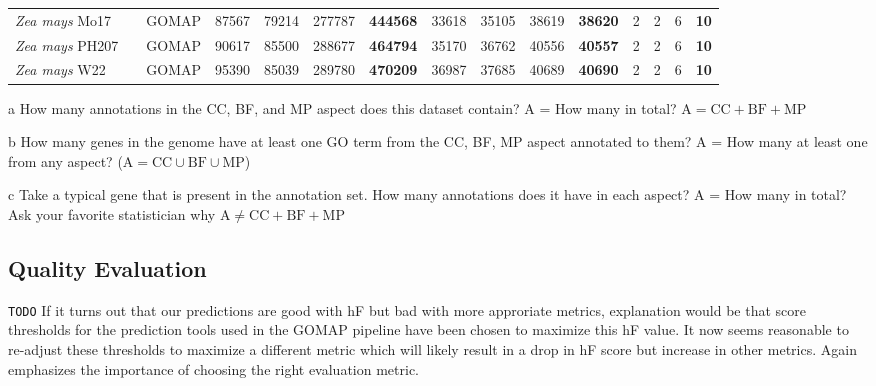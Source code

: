 \documentclass[utf8]{frontiersSCNS}
\begin{document}
\begin{table}[t]
{\begin{threeparttable}
\begin{tabular}{lrlrrr>{\bfseries}r|rrr>{\bfseries}r|rrr>{\bfseries}r}
\textit{Zea mays} Mo17 &  & GOMAP & 87567 & 79214 & 277787 & 444568 & 33618 & 35105 & 38619 & 38620 & 2 & 2 & 6 & 10\\

\rowcolor{gray!6}  \textit{Zea mays} PH207 &  & GOMAP & 90617 & 85500 & 288677 & 464794 & 35170 & 36762 & 40556 & 40557 & 2 & 2 & 6 & 10\\

\textit{Zea mays} W22 & \multirow{-24}{*}{\raggedleft\arraybackslash 100} & GOMAP & 95390 & 85039 & 289780 & 470209 & 36987 & 37685 & 40689 & 40690 & 2 & 2 & 6 & 10\\
\bottomrule
\end{tabular}
\begin{tablenotes}
\item[a] How many annotations in the CC, BF, and MP aspect does this dataset contain? A = How many in total? $\textrm{A} = \textrm{CC} + \textrm{BF} + \textrm{MP}$
\item[b] How many genes in the genome have at least one GO term from the CC, BF, MP aspect annotated to them? A = How many at least one from any aspect? ($\textrm{A} = \textrm{CC} \cup \textrm{BF} \cup \textrm{MP}$)
\item[c] Take a typical gene that is present in the annotation set. How many annotations does it have in each aspect? A = How many in total? Ask your favorite statistician why $\textrm{A} \neq \textrm{CC} + \textrm{BF} +\textrm{MP}$
\end{tablenotes}
\end{threeparttable}}
\end{table}

\hypertarget{quality-evaluation}{%
\subsection{Quality Evaluation}\label{quality-evaluation}}

\texttt{TODO} If it turns out that our predictions are good with hF but bad with more approriate metrics, explanation would be that score thresholds for the prediction tools used in the GOMAP pipeline have been chosen to maximize this hF value. It now seems reasonable to re-adjust these thresholds to maximize a different metric which will likely result in a drop in hF score but increase in other metrics. Again emphasizes the importance of choosing the right evaluation metric.
\end{document}
